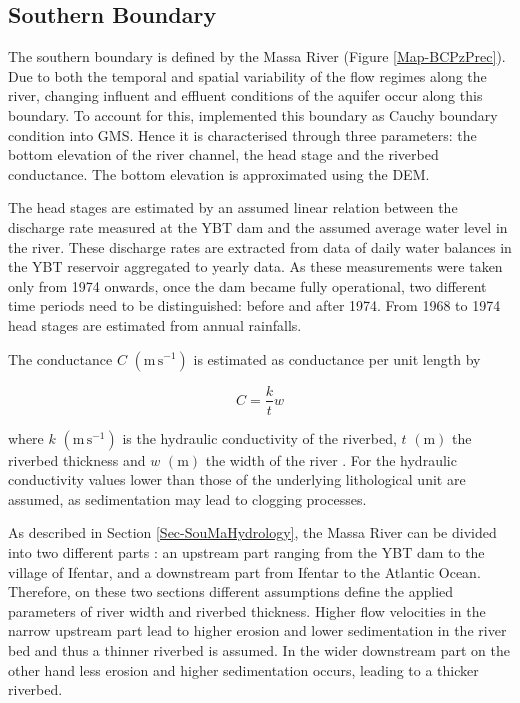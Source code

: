 \subsection{Southern Boundary}

The southern boundary is defined by the Massa River (Figure \ref{Map-BCPzPrec}). 
Due to both the temporal and spatial variability of the flow regimes along the river, changing influent and effluent conditions of the aquifer occur along this boundary. 
To account for this, \cite{Horn.2021} implemented this boundary as Cauchy boundary condition into GMS. 
Hence it is characterised through three parameters: the bottom elevation of the river channel, the head stage and the riverbed conductance. 
The bottom elevation is approximated using the DEM.

The head stages are estimated by an assumed linear relation between the discharge rate measured at the YBT dam and the assumed average water level in the river. 
These discharge rates are extracted from data of daily water balances in the YBT reservoir aggregated to yearly data. 
As these measurements were taken only from 1974 onwards, once the dam became fully operational, two different time periods need to be distinguished: before and after 1974. 
From 1968 to 1974 head stages are estimated from annual rainfalls.

The conductance $C$ $\left( \textrm{m} \, \textrm{s}^{-1} \right)$ is estimated as conductance per unit length by

\begin{equation}
    C = \frac{k}{t} w
\end{equation}

where $k$ $\left( \textrm{m} \, \textrm{s}^{-1} \right)$ is the hydraulic conductivity of the riverbed, $t$ $\left( \textrm{m} \right)$ the riverbed thickness and $w$ $\left( \textrm{m}\right)$ the width of the river \parencite{Aquaveo.2019}. 
For the hydraulic conductivity values lower than those of the underlying lithological unit are assumed, as sedimentation may lead to clogging processes.

As described in Section \ref{Sec-SouMaHydrology}, the Massa River can be divided into two different parts \parencite{Horn.2021}: an upstream part ranging from the YBT dam to the village of Ifentar, and a downstream part from Ifentar to the Atlantic Ocean. 
Therefore, on these two sections different assumptions define the applied parameters of river width and riverbed thickness. 
Higher flow velocities in the narrow upstream part lead to higher erosion and lower sedimentation in the river bed and thus a thinner riverbed is assumed. 
In the wider downstream part on the other hand less erosion and higher sedimentation occurs, leading to a thicker riverbed.

